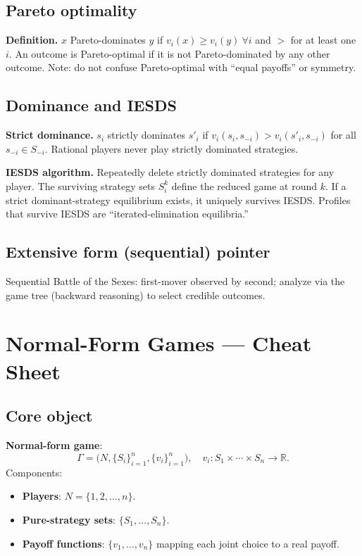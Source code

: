 \documentclass[11pt]{article}
\begin{document}
\begin{multicols}{2}
\subsection*{Pareto optimality}
\textbf{Definition.} $x$ Pareto-dominates $y$ if $v_i(x)\ge v_i(y)\ \forall i$ and $> $ for at least one $i$.
An outcome is Pareto-optimal if it is not Pareto-dominated by any other outcome.
Note: do not confuse Pareto-optimal with “equal payoffs” or symmetry.

\subsection*{Dominance and IESDS}
\textbf{Strict dominance.} $s_i$ strictly dominates $s'_i$ if $v_i(s_i,s_{-i})>v_i(s'_i,s_{-i})$ for all $s_{-i}\in S_{-i}$.
Rational players never play strictly dominated strategies.

\textbf{IESDS algorithm.} Repeatedly delete strictly dominated strategies for any player. The surviving strategy sets $S_i^k$ define the reduced game at round $k$.
If a strict dominant-strategy equilibrium exists, it uniquely survives IESDS.
Profiles that survive IESDS are “iterated-elimination equilibria.”

\subsection*{Extensive form (sequential) pointer}
Sequential Battle of the Sexes: first-mover observed by second; analyze via the game tree (backward reasoning) to select credible outcomes.

\newpage
\section*{Normal-Form Games — Cheat Sheet}

\subsection*{Core object}
\textbf{Normal-form game}:
\[
\Gamma=\bigl(N,\{S_i\}_{i=1}^n,\{v_i\}_{i=1}^n\bigr),
\quad
v_i:S_1\times\cdots\times S_n\to\mathbb{R}.
\]
Components:
\begin{itemize}
  \item \textbf{Players}: $N=\{1,2,\dots,n\}$.
  \item \textbf{Pure-strategy sets}: $\{S_1,\dots,S_n\}$.
  \item \textbf{Payoff functions}: $\{v_1,\dots,v_n\}$ mapping each joint choice to a real payoff.
\end{itemize}


\end{multicols}
\end{document}
